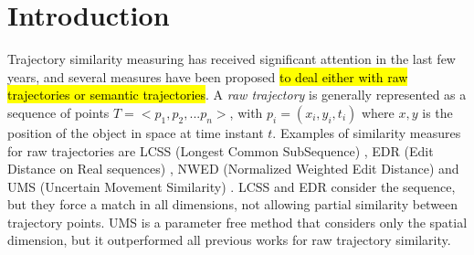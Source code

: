 \documentclass[12pt]{article}
\providecommand{\keywords}[1]
{
  \small    
  \textbf{\textit{Keywords---}} #1
}
\begin{document}
 




\section{Introduction}
Trajectory similarity measuring has received significant attention in the last few years, and several measures have been proposed \hl{to deal either with raw trajectories or semantic trajectories}. A \emph{raw trajectory} is generally represented as a sequence of points $T=<p_1, p_2, ...p_n>$, with $p_i=(x_i,y_i,t_i)$ where $x,y$ is the position of the object in space at time instant $t$.  Examples of similarity measures for raw trajectories are LCSS (Longest Common SubSequence) \citep{vlachos2002discovering}, EDR (Edit Distance on Real sequences) \citep{Chen:2005:RFS:1066157.1066213}, NWED (Normalized Weighted Edit Distance) \citep{dodge2012} and UMS (Uncertain Movement Similarity) \citep{Furtado-UMS-2018}. LCSS \citep{vlachos2002discovering} and EDR \citep{Chen:2005:RFS:1066157.1066213} consider the sequence, but they force a match in all dimensions, not allowing partial similarity between trajectory points.  %
UMS \citep{Furtado-UMS-2018} is a parameter free method that considers only the spatial dimension, but it outperformed all previous works for raw trajectory similarity.
\end{document}
